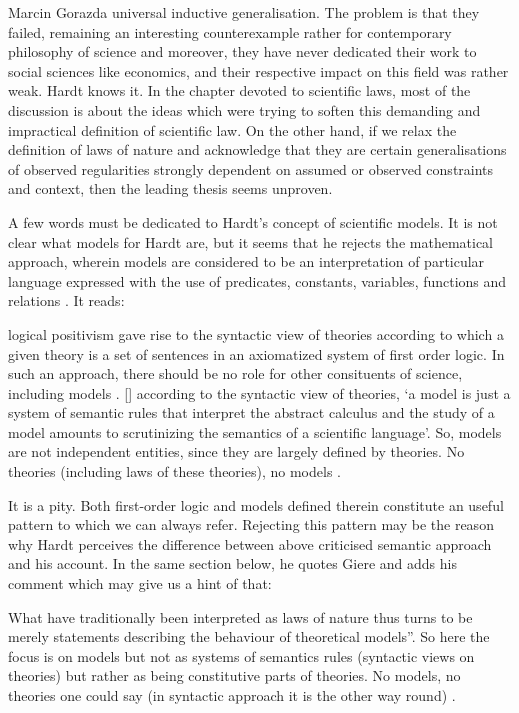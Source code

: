 \begin{recengenv}{Marcin Gorazda}
universal inductive generalisation. The problem is that they failed, remaining an interesting counterexample rather for
contemporary philosophy of science and moreover, they have never dedicated their work to social sciences like
economics, and their respective impact on this field was rather weak. Hardt knows it. In the chapter devoted to
scientific laws, most of the discussion is about the ideas which were trying to soften this demanding and impractical
definition of scientific law. On the other hand, if we relax the definition of laws of nature and acknowledge that they
are certain generalisations of observed regularities strongly dependent on assumed or observed constraints and context,
then the leading thesis seems unproven. 

A few words must be dedicated to Hardt’s concept of scientific models. It is not clear what models for Hardt are, but it
seems that he rejects the mathematical approach, wherein models are considered to be an interpretation of particular
language expressed with the use of predicates, constants, variables, functions and relations
\parencite{margaris_first_1990}.
It reads:

\begin{myquoterev}
[\mydots] logical positivism gave rise to the syntactic view of theories according to which a given theory is a set of
sentences in an axiomatized system of first order logic. In such an approach, there should be no role for other
consituents of science, including models . [\mydots] according to the syntactic view of theories, ‘a model is just a system
of semantic rules that interpret the abstract calculus and the study of a model amounts to scrutinizing the semantics
of a scientific language’. So, models are not independent entities, since they are largely defined by theories. No
theories (including laws of these theories), no models
\parencite[p.71]{hardt_economics_2017}.
\end{myquoterev}

It is a pity. Both first-order logic and models defined therein constitute an useful pattern to which we can always
refer. Rejecting this pattern may be the reason why Hardt perceives the difference between above criticised semantic
approach and his account. In the same section below, he quotes Giere and adds his comment which may give us a hint of
that:

\begin{myquoterev}
What have traditionally been interpreted as laws of nature thus turns to be merely statements describing the behaviour
of theoretical models''. So here the focus is on models but not as systems of semantics rules (syntactic views on
theories) but rather as being constitutive parts of theories. No models, no theories one could say (in syntactic
approach it is the other way round)
\parencite[p.72]{hardt_economics_2017}.
\end{myquoterev}


\end{recengenv}
